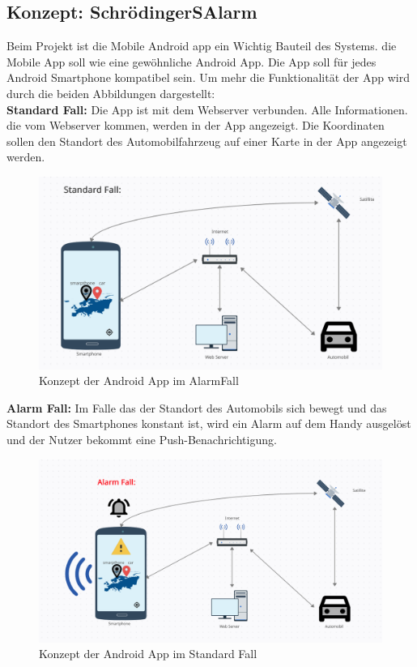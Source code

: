 \subsection{Konzept: SchrödingerSAlarm}
Beim Projekt ist die Mobile Android app ein Wichtig Bauteil des Systems.
die Mobile App soll wie eine gewöhnliche Android App. Die App soll für jedes Android Smartphone kompatibel sein. Um mehr die Funktionalität der App wird durch die beiden Abbildungen dargestellt:\\
\textbf{Standard Fall:} Die App ist mit dem Webserver verbunden. Alle Informationen. die vom Webserver kommen, werden in der App angezeigt. Die Koordinaten sollen den Standort des Automobilfahrzeug auf einer Karte in der App angezeigt werden.
\begin{figure}[H]
            \centering
            \includegraphics[width=1\textwidth]{Bilder/StandardFall.PNG}
            \caption{Konzept der Android App im AlarmFall}
\end{figure}
\textbf{Alarm Fall:} Im Falle das der Standort des Automobils sich bewegt und das Standort des Smartphones konstant ist, wird ein Alarm auf dem Handy ausgelöst und der Nutzer bekommt eine Push-Benachrichtigung.
     \begin{figure}[H]
            \centering
            \includegraphics[width=1\textwidth]{Bilder/AlarmFall.PNG}
            \caption{Konzept der Android App im Standard Fall}
	
    \end{figure}
	

